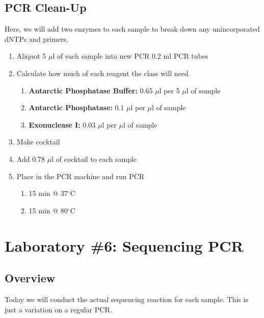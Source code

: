 \documentclass[12pt, hidelinks]{article}
\begin{document}
	
	\subsection{PCR Clean-Up}	
	Here, we will add two enzymes to each sample to break down any unincorporated dNTPs and primers.
	
		\begin{enumerate}
			\item Aliquot 5 $\mu$l of each sample into new PCR 0.2 ml PCR tubes
			\item Calculate how much of each reagent the class will need
				\begin{enumerate}
					\item \textbf{Antarctic Phosphatase Buffer:} 0.65 $\mu$l per 5 $\mu$l of sample
					\item \textbf{Antarctic Phosphatase:} 0.1 $\mu$l per $\mu$l of sample
					\item \textbf{Exonuclease I:} 0.03 $\mu$l per $\mu$l of sample
				\end{enumerate}
			\item Make cocktail
			\item Add 0.78 $\mu$l of cocktail to each sample
			\item Place in the PCR machine and run PCR
				\begin{enumerate}
					\item 15 min @ 37$^{\circ}$C
					\item 15 min @ 80$^{\circ}$C
				\end{enumerate}
		\end{enumerate}


\newpage
\section{Laboratory \#6: Sequencing PCR}


	\subsection{Overview}
	Today we will conduct the actual sequencing reaction for each sample. This is just a variation on a regular PCR.
	
	
\end{document}
